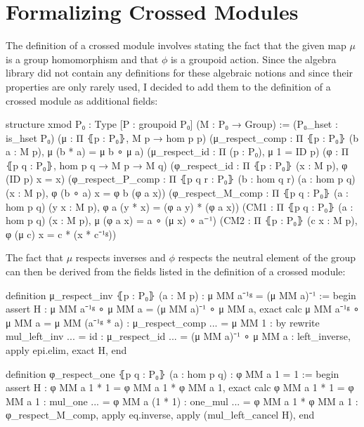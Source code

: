 \section{Formalizing Crossed Modules}

The definition of a crossed module involves stating the fact that the given map
$\mu$ is a group homomorphism and that $\phi$ is a groupoid action.
Since the algebra library did not contain any definitions for these algebraic
notions and since their properties are only rarely used, I decided to add them
to the definition of a crossed module as additional fields:
\begin{leancodebr}
structure xmod {P₀ : Type} [P : groupoid P₀] (M : P₀ → Group) :=
  (P₀_hset : is_hset P₀)
  (μ : Π ⦃p : P₀⦄, M p → hom p p)
  (μ_respect_comp : Π ⦃p : P₀⦄ (b a : M p), μ (b * a) = μ b ∘ μ a)
  (μ_respect_id : Π (p : P₀), μ 1 = ID p)
  (φ : Π ⦃p q : P₀⦄, hom p q → M p → M q)
  (φ_respect_id : Π ⦃p : P₀⦄ (x : M p), φ (ID p) x = x)
  (φ_respect_P_comp : Π ⦃p q r : P₀⦄ (b : hom q r) (a : hom p q) (x : M p),
    φ (b ∘ a) x = φ b (φ a x))
  (φ_respect_M_comp : Π ⦃p q : P₀⦄ (a : hom p q) (y x : M p),
    φ a (y * x) = (φ a y) * (φ a x))
  (CM1 : Π ⦃p q : P₀⦄ (a : hom p q) (x : M p), μ (φ a x) = a ∘ (μ x) ∘ a⁻¹)
  (CM2 : Π ⦃p : P₀⦄ (c x : M p), φ (μ c) x = c * (x * c⁻¹ᵍ))
\end{leancodebr}

The fact that $\mu$ respects inverses and $\phi$ respects the neutral element
of the group can then be derived from the fields listed in the definition of
a crossed module:
\begin{leancodebr}
  definition μ_respect_inv ⦃p : P₀⦄ (a : M p) : μ MM a⁻¹ᵍ = (μ MM a)⁻¹ :=
  begin
    assert H : μ MM a⁻¹ᵍ ∘ μ MM a = (μ MM a)⁻¹ ∘ μ MM a,
      exact calc μ MM a⁻¹ᵍ ∘ μ MM a = μ MM (a⁻¹ᵍ * a) : μ_respect_comp
                               ... = μ MM 1 : by rewrite mul_left_inv
                               ... = id : μ_respect_id
                               ... = (μ MM a)⁻¹ ∘ μ MM a : left_inverse,
    apply epi.elim, exact H,
  end

  definition φ_respect_one ⦃p q : P₀⦄ (a : hom p q) : φ MM a 1 = 1 :=
  begin
    assert H : φ MM a 1 * 1 = φ MM a 1 * φ MM a 1,
      exact calc φ MM a 1 * 1 = φ MM a 1 : mul_one
                          ... = φ MM a (1 * 1)  : one_mul
                          ... = φ MM a 1 * φ MM a 1 : φ_respect_M_comp,
    apply eq.inverse, apply (mul_left_cancel H),
  end
\end{leancodebr}


